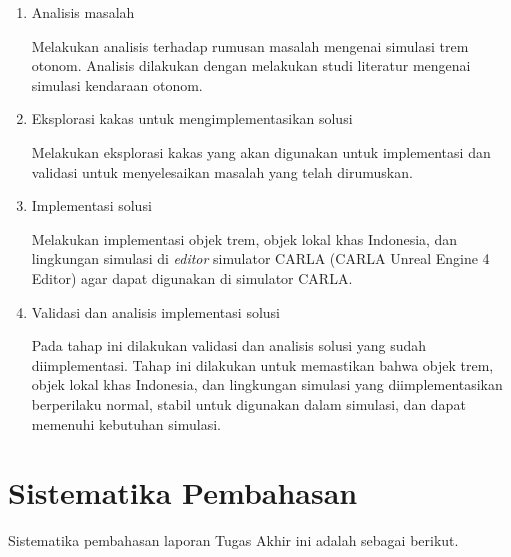 \begin{enumerate}

    \item Analisis masalah

    Melakukan analisis terhadap rumusan masalah mengenai simulasi trem otonom.
    Analisis dilakukan dengan melakukan studi literatur mengenai simulasi
    kendaraan otonom.

    \item Eksplorasi kakas untuk mengimplementasikan solusi

    Melakukan eksplorasi kakas yang akan digunakan untuk implementasi dan
    validasi untuk menyelesaikan masalah yang telah dirumuskan.

    \item Implementasi solusi

    Melakukan implementasi objek trem, objek lokal khas Indonesia, dan
    lingkungan simulasi di \textit{editor} simulator CARLA (CARLA Unreal Engine
    4 Editor) agar dapat digunakan di simulator CARLA.

    \item Validasi dan analisis implementasi solusi

    Pada tahap ini dilakukan validasi dan analisis solusi yang sudah
    diimplementasi. Tahap ini dilakukan untuk memastikan bahwa objek trem, objek
    lokal khas Indonesia, dan lingkungan simulasi yang diimplementasikan
    berperilaku normal, stabil untuk digunakan dalam simulasi, dan dapat
    memenuhi kebutuhan simulasi.

\end{enumerate}

\section{Sistematika Pembahasan}
Sistematika pembahasan laporan Tugas Akhir ini adalah sebagai berikut.

